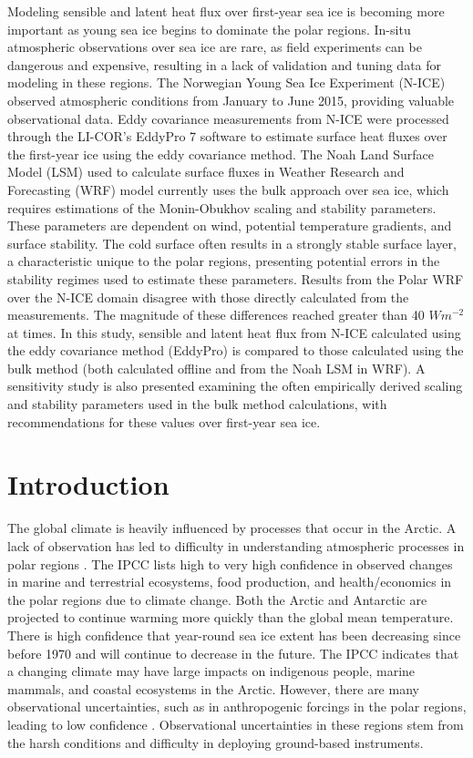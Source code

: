 \begin{spacing}{1} \noindent Modeling sensible and latent heat flux over first-year sea ice is becoming more important as young sea ice begins to dominate the polar regions. In-situ atmospheric observations over sea ice are rare, as field experiments can be dangerous and expensive, resulting in a lack of validation and tuning data for modeling in these regions. The Norwegian Young Sea Ice Experiment (N-ICE) observed atmospheric conditions from January to June 2015, providing valuable observational data. Eddy covariance measurements from N-ICE were processed through the LI-COR’s EddyPro 7 software to estimate surface heat fluxes over the first-year ice using the eddy covariance method. The Noah Land Surface Model (LSM) used to calculate surface fluxes in Weather Research and Forecasting (WRF) model currently uses the bulk approach over sea ice, which requires estimations of the Monin-Obukhov scaling and stability parameters. These parameters are dependent on wind, potential temperature gradients, and surface stability. The cold surface often results in a strongly stable surface layer, a characteristic unique to the polar regions, presenting potential errors in the stability regimes used to estimate these parameters. Results from the Polar WRF over the N-ICE domain disagree with those directly calculated from the measurements. The magnitude of these differences reached greater than 40 $Wm^{-2}$ at times. In this study, sensible and latent heat flux from N-ICE calculated using the eddy covariance method (EddyPro) is compared to those calculated using the bulk method (both calculated offline and from the Noah LSM in WRF). A sensitivity study is also presented examining the often empirically derived scaling and stability parameters used in the bulk method calculations, with recommendations for these values over first-year sea ice.
\end{spacing}

\doublespacing
\section{Introduction}
The global climate is heavily influenced by processes that occur in the Arctic. A lack of observation has led to difficulty in understanding atmospheric processes in polar regions \citep{persson:2002}. The IPCC \citep{IPCC:14} lists high to very high confidence in observed changes in marine and terrestrial ecosystems, food production, and health/economics in the polar regions due to climate change. Both the Arctic and Antarctic are projected to continue warming more quickly than the global mean temperature. There is high confidence that year-round sea ice extent has been decreasing since before 1970 and will continue to decrease in the future. The IPCC \citep{IPCC:14} indicates that a changing climate may have large impacts on indigenous people, marine mammals, and coastal ecosystems in the Arctic. However, there are many observational uncertainties, such as in anthropogenic forcings in the polar regions, leading to low confidence \citep{IPCC:14}. Observational uncertainties in these regions stem from the harsh conditions and difficulty in deploying ground-based instruments.

